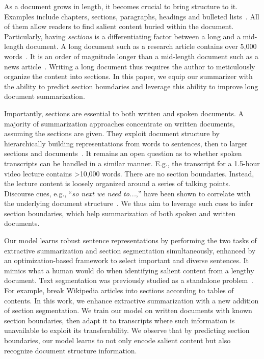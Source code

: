 \documentclass[11pt]{article}
\begin{document}
As a document grows in length, it becomes crucial to bring structure to it.
Examples include chapters, sections, paragraphs, headings and bulleted lists~\cite{power-etal-2003-document}.
All of them allow readers to find salient content buried within the document.
Particularly, having \emph{sections} is a differentiating factor between a long and a mid-length document.  
A long document such as a research article contains over 5,000 words~\cite{cohan-etal-2018-discourse}.
It is an order of magnitude longer than a mid-length document such as a news article~\cite{see-etal-2017-get}.
Writing a long document thus requires the author to meticulously organize the content into sections.
In this paper, we equip our summarizer with the ability to predict section boundaries 
and leverage this ability to improve long document summarization. 


Importantly, sections are essential to both written and spoken documents.
A majority of summarization approaches concentrate on written documents, assuming the sections are given.
They exploit document structure by hierarchically building representations from words to sentences, 
then to larger sections and documents~\cite{xiao-carenini-2019-extractive,liu-lapata-2019-text,narayan-etal-2020-stepwise}.
It remains an open question as to whether spoken transcripts can be handled in a similar manner.
E.g., the transcript for a 1.5-hour video lecture contains >10,000 words.
There are no section boundaries.
Instead, the lecture content is loosely organized around a series of talking points.
Discourse cues, e.g., ``\emph{so next we need to...},'' have been shown to correlate with the underlying document structure~\cite{hearst-1997-text}.
We thus aim to leverage such cues to infer section boundaries, which help summarization of both spoken and written documents. 


Our model learns robust sentence representations by performing the two tasks of extractive summarization and section segmentation simultaneously,
enhanced by an optimization-based framework to select important and diverse sentences.
It mimics what a human would do when identifying salient content from a lengthy document. 
Text segmentation was previously studied as a standalone problem~\cite{arnold-etal-2019-sector,xing-etal-2020-improving,lukasik-etal-2020-text}.
For example, \citet{koshorek-etal-2018-text} break Wikipedia articles into sections according to tables of contents. 
In this work, we enhance extractive summarization with a new addition of section segmentation. 
We train our model on written documents with known section boundaries, 
then adapt it to transcripts where such information is unavailable to exploit its transferability.
We observe that by predicting section boundaries, our model learns to not only encode salient content 
but also recognize document structure information. 
\end{document}
